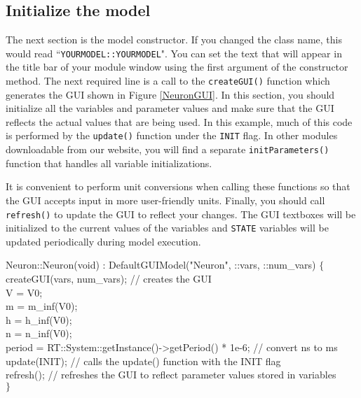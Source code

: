 \subsection{Initialize the model}

The next section is the model constructor. If you changed the class name, this would read ``\texttt{YOURMODEL::YOURMODEL}". You can set the text that will appear in the title bar of your module window using the first argument of the constructor method. \attention The next required line is a call to the \texttt{createGUI()} function which generates the GUI shown in Figure \ref{NeuronGUI}. In this section, you should initialize all the variables and parameter values and make sure that the GUI reflects the actual values that are being used. In this example, much of this code is performed by the  \texttt{update()} function under the \texttt{INIT} flag. In other modules downloadable from our website, you will find a separate \texttt{initParameters()} function that handles all variable initializations. 

It is convenient to perform unit conversions when calling these functions so that the GUI accepts input in more user-friendly units. Finally, you should call \texttt{refresh()} to update the GUI to reflect your changes. The GUI textboxes will be initialized to the current values of the variables and \texttt{STATE} variables will be updated periodically during model execution. 
\begin{maxipage}
\begin{example}
Neuron::Neuron(void) : DefaultGUIModel("Neuron", ::vars, ::num\_vars) $\{$\\
\hspace{.5cm}createGUI(vars, num\_vars); // creates the GUI\\ 
\hspace{.5cm}V = V0;\\
\hspace{.5cm}m = m\_inf(V0);\\
\hspace{.5cm}h = h\_inf(V0);\\
\hspace{.5cm}n = n\_inf(V0);\\
\hspace{.5cm}period = RT::System::getInstance()->getPeriod() * 1e-6; // convert ns to ms\\
\hspace{.5cm}update(INIT); // calls the update() function with the INIT flag\\
\hspace{.5cm}refresh(); // refreshes the GUI to reflect parameter values stored in variables\\
$\}$
\end{example}
\end{maxipage}

